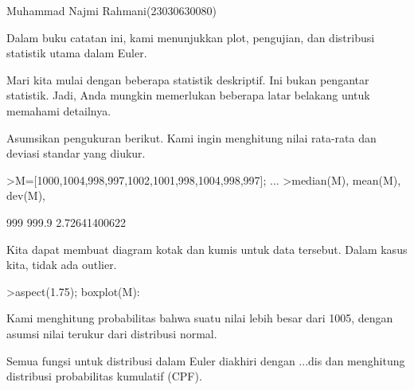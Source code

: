 \documentclass[a4paper,10pt]{article}
\begin{document}
\begin{eulernotebook}
\begin{eulercomment}
Muhammad Najmi Rahmani(23030630080)

Dalam buku catatan ini, kami menunjukkan plot, pengujian, dan
distribusi statistik utama dalam Euler.

Mari kita mulai dengan beberapa statistik deskriptif. Ini bukan
pengantar statistik. Jadi, Anda mungkin memerlukan beberapa latar
belakang untuk memahami detailnya.

Asumsikan pengukuran berikut. Kami ingin menghitung nilai rata-rata
dan deviasi standar yang diukur.
\end{eulercomment}
\begin{eulerprompt}
>M=[1000,1004,998,997,1002,1001,998,1004,998,997]; ...
>median(M), mean(M), dev(M),
\end{eulerprompt}
\begin{euleroutput}
  999
  999.9
  2.72641400622
\end{euleroutput}
\begin{eulercomment}
Kita dapat membuat diagram kotak dan kumis untuk data tersebut. Dalam
kasus kita, tidak ada outlier.
\end{eulercomment}
\begin{eulerprompt}
>aspect(1.75); boxplot(M):
\end{eulerprompt}
\begin{eulercomment}
Kami menghitung probabilitas bahwa suatu nilai lebih besar dari 1005,
dengan asumsi nilai terukur dari distribusi normal.

Semua fungsi untuk distribusi dalam Euler diakhiri dengan ...dis dan
menghitung distribusi probabilitas kumulatif (CPF).


\end{eulercomment}
\end{eulernotebook}
\end{document}
